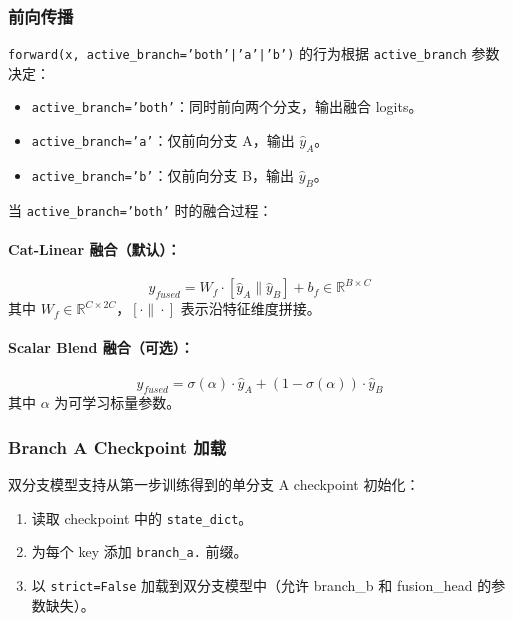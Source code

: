 \documentclass[a4paper,11pt]{article}
\begin{document}
\subsubsection{前向传播}

\texttt{forward(x, active\_branch='both'|'a'|'b')} 的行为根据 \texttt{active\_branch} 参数决定：

\begin{itemize}
    \item \texttt{active\_branch='both'}：同时前向两个分支，输出融合 logits。
    \item \texttt{active\_branch='a'}：仅前向分支 A，输出 $\hat{y}_A$。
    \item \texttt{active\_branch='b'}：仅前向分支 B，输出 $\hat{y}_B$。
\end{itemize}

当 \texttt{active\_branch='both'} 时的融合过程：

\paragraph{Cat-Linear 融合（默认）：}
\[
    \hat{y}_{fused} = W_f \cdot [\hat{y}_A \| \hat{y}_B] + b_f \in \mathbb{R}^{B \times C}
\]
其中 $W_f \in \mathbb{R}^{C \times 2C}$，$[\cdot \| \cdot]$ 表示沿特征维度拼接。

\paragraph{Scalar Blend 融合（可选）：}
\[
    \hat{y}_{fused} = \sigma(\alpha) \cdot \hat{y}_A + (1 - \sigma(\alpha)) \cdot \hat{y}_B
\]
其中 $\alpha$ 为可学习标量参数。

\subsubsection{Branch A Checkpoint 加载}

双分支模型支持从第一步训练得到的单分支 A checkpoint 初始化：
\begin{enumerate}
    \item 读取 checkpoint 中的 \texttt{state\_dict}。
    \item 为每个 key 添加 \texttt{branch\_a.} 前缀。
    \item 以 \texttt{strict=False} 加载到双分支模型中（允许 branch\_b 和 fusion\_head 的参数缺失）。
\end{enumerate}

\end{document}
